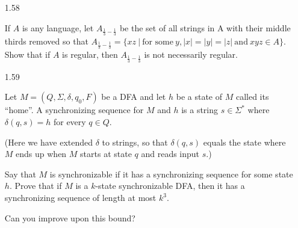 \begin{enumerate}
      \item [1.58]
            
            If $A$ is any language, let $A_{\frac{1}{3}-\frac{1}{3}}$ be the set of all strings in A with their middle thirds removed so that $A_{\frac{1}{3}-\frac{1}{3}} = \{xz~|~ \text{for some}~ y, |x| = |y| = |z|~ \text{and}~ xyz \in A\}$. Show that if $A$ is regular, then $A_{\frac{1}{3}-\frac{1}{3}}$ is not necessarily regular.
            
      \item [1.59]
            
            Let $M = (Q,\Sigma, \delta, q_0, F)$ be a DFA and let $h$ be a state of $M$ called its “home”. A synchronizing sequence for $M$ and $h$ is a string $s \in \Sigma^\ast$ where $\delta(q,s)=h$ for every $q \in Q$. 
            
            (Here we have extended $\delta$ to strings, so that $\delta(q,s)$ equals the state where $M$ ends up when $M$ starts at state $q$ and reads input $s$.) 
            
            Say that $M$ is synchronizable if it has a synchronizing sequence for some state $h$. Prove that if $M$ is a $k$-state synchronizable DFA, then it has a synchronizing sequence of length at most $k^3$. 
            
            Can you improve upon this bound?
            
\end{enumerate}
